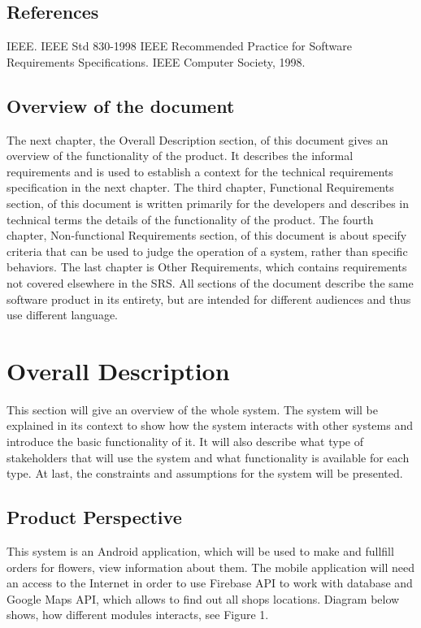 \documentclass{scrreprt}
\begin{document}
\section{References}
IEEE. IEEE Std 830-1998 IEEE Recommended Practice for Software Requirements Specifications. IEEE Computer Society, 1998.

\section{Overview of the document}
The next chapter, the Overall Description section, of this document gives an overview of the functionality of the product. It describes the informal requirements and is used to establish a context for the technical requirements specification in the next chapter.
The third chapter, Functional Requirements section, of this document is written primarily for the developers and describes in technical terms the details of the functionality of the product.
The fourth chapter, Non-functional Requirements section, of this document is about specify criteria that can be used to judge the operation of a system, rather than specific behaviors.
The last chapter is Other Requirements, which contains  requirements not covered elsewhere in the SRS.
All sections of the document describe the same software product in its entirety, but are intended for different audiences and thus use different language.

\chapter{Overall Description}

This section will give an overview of the whole system. The system will be explained in its context to show how the system interacts with other systems and introduce the basic functionality of it. It will also describe what type of stakeholders that will use the system and what functionality is available for each type. At last, the constraints and assumptions for the system will be presented.

\section{Product Perspective}
This system is an Android application, which will be used to make and fullfill orders for flowers, view information about them. The mobile application will need an access to the Internet in order to use Firebase API to work with database and Google Maps API, which allows to find out all shops locations. Diagram below shows, how different modules interacts, see Figure 1.
\end{document}
